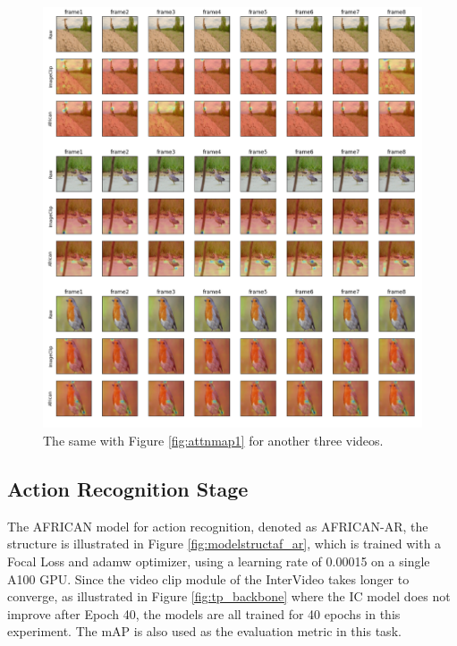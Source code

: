 \begin{figure}[ht]
    \centering
    \includegraphics[width=1.0\textwidth]{assets/charts/4_5_AttentionMaps_2}
    \caption[Attention Map 1]{The same with Figure \ref{fig:attnmap1} for another three videos.}
    \label{fig:attnmap2}
\end{figure}







\subsection{Action Recognition Stage}
The AFRICAN model for action recognition, denoted as AFRICAN-AR, the structure is illustrated in Figure \ref{fig:modelstructaf_ar}, which is trained with a Focal Loss and adamw optimizer, using a learning rate of 0.00015 on a single A100 GPU. Since the video clip module of the InterVideo takes longer to converge, as illustrated in Figure \ref{fig:tp_backbone} where the IC model does not improve after Epoch 40, the models are all trained for 40 epochs in this experiment. The mAP is also used as the evaluation metric in this task.

